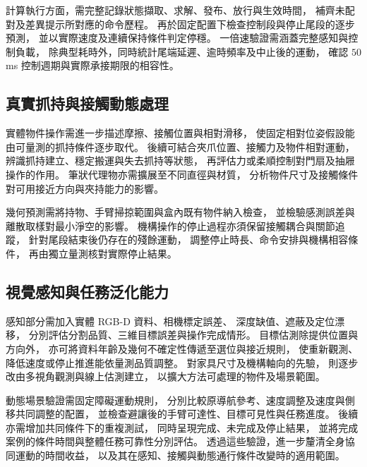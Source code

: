 計算執行方面，需完整記錄狀態擷取、求解、發布、放行與生效時間，
補齊未配對及差異提示所對應的命令歷程。
再於固定配置下檢查控制段與停止尾段的逐步預測，
並以實際速度及連續保持條件判定停穩。
一倍速驗證需涵蓋完整感知與控制負載，
除典型耗時外，同時統計尾端延遲、逾時頻率及中止後的運動，
確認 $50$ ms 控制週期與實際承接期限的相容性。

\subsection{真實抓持與接觸動態處理}
\label{subsec:future_grasp_contact_dynamics}

實體物件操作需進一步描述摩擦、接觸位置與相對滑移，
使固定相對位姿假設能由可量測的抓持條件逐步取代。
後續可結合夾爪位置、接觸力及物件相對運動，
辨識抓持建立、穩定搬運與失去抓持等狀態，
再評估力或柔順控制對門扇及抽屜操作的作用。
筆狀代理物亦需擴展至不同直徑與材質，
分析物件尺寸及接觸條件對可用接近方向與夾持能力的影響。

幾何預測需將持物、手臂掃掠範圍與盒內既有物件納入檢查，
並檢驗感測誤差與離散取樣對最小淨空的影響。
機構操作的停止過程亦須保留接觸耦合與關節追蹤，
針對尾段結束後仍存在的殘餘運動，
調整停止時長、命令安排與機構相容條件，
再由獨立量測核對實際停止結果。

\subsection{視覺感知與任務泛化能力}
\label{subsec:future_perception_task_generalization}

感知部分需加入實體 RGB-D 資料、相機標定誤差、
深度缺值、遮蔽及定位漂移，
分別評估分割品質、三維目標誤差與操作完成情形。
目標估測除提供位置與方向外，
亦可將資料年齡及幾何不確定性傳遞至選位與接近規則，
使重新觀測、降低速度或停止推進能依量測品質調整。
對家具尺寸及機構軸向的先驗，
則逐步改由多視角觀測與線上估測建立，
以擴大方法可處理的物件及場景範圍。

動態場景驗證需固定障礙運動規則，
分別比較原導航參考、速度調整及速度與側移共同調整的配置，
並檢查避讓後的手臂可達性、目標可見性與任務進度。
後續亦需增加共同條件下的重複測試，
同時呈現完成、未完成及停止結果，
並將完成案例的條件時間與整體任務可靠性分別評估。
透過這些驗證，進一步釐清全身協同運動的時間收益，
以及其在感知、接觸與動態通行條件改變時的適用範圍。
